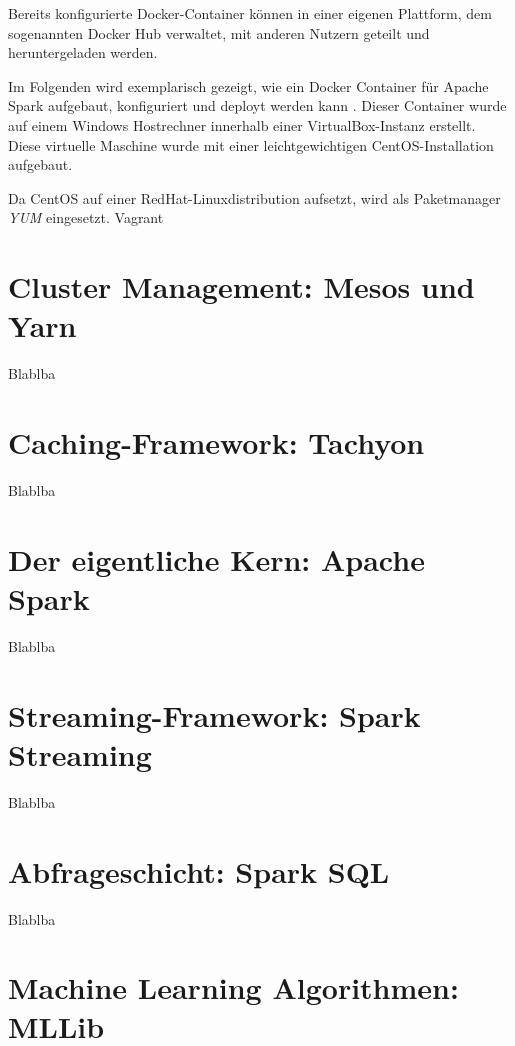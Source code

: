 Bereits konfigurierte Docker-Container können in einer eigenen Plattform, dem sogenannten Docker Hub verwaltet, mit anderen Nutzern geteilt und heruntergeladen werden. 

Im Folgenden wird exemplarisch gezeigt, wie ein Docker Container für Apache Spark aufgebaut, konfiguriert und deployt werden kann . Dieser Container wurde auf einem Windows Hostrechner innerhalb einer VirtualBox-Instanz erstellt. Diese virtuelle Maschine wurde mit einer leichtgewichtigen CentOS-Installation aufgebaut. 

Da CentOS auf einer RedHat-Linuxdistribution aufsetzt, wird als Paketmanager \textit{YUM} eingesetzt. Vagrant







  

\section{Cluster Management: Mesos und Yarn }
\label{section:mesos}

Blablba

\section{Caching-Framework: Tachyon}
\label{section:tachyon}

Blablba

\section{Der eigentliche Kern: Apache Spark}
\label{section:kern}

Blablba

\section{Streaming-Framework: Spark Streaming}
\label{section:streaming}

Blablba

\section{Abfrageschicht: Spark SQL}
\label{section:spark sql}

Blablba

\section{Machine Learning Algorithmen: MLLib}
\label{section:mllib arch}

